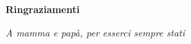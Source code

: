 \thispagestyle{empty}

\begin{center}
  {\bf \Huge Ringraziamenti}
\end{center}

\vspace{4cm}


\emph{
 A mamma e papà, per esserci sempre stati
}
